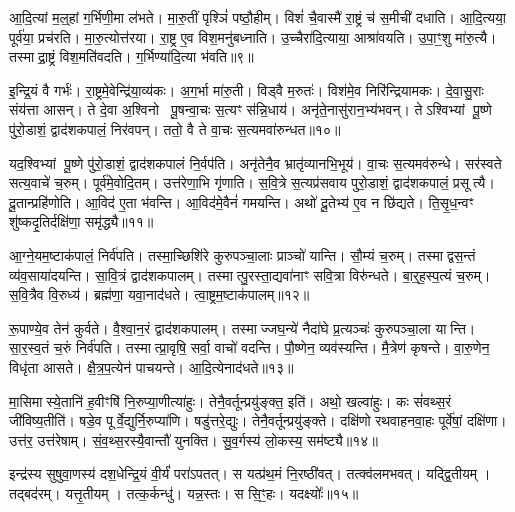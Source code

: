 आ॒दि॒त्यां म॒ल्॒हां ग॒र्भिणी॒मा ल॑भते।
मा॒रु॒तीं पृश्ञिं॑ पष्ठौ॒हीम्।
विशं॑ चै॒वास्मै॑ रा॒ष्ट्रं च॑ स॒मीची॑ दधाति।
आ॒दि॒त्यया॒ पूर्व॑या॒ प्रच॑रति।
मा॒रु॒त्योत्त॑रया।
रा॒ष्ट्र ए॒व विश॒मनु॑बध्नाति।
उ॒च्चैरा॑दि॒त्याया॒ आश्रा॑वयति।
उ॒पा॒ꣳ॒शु मा॑रु॒त्यै।
तस्माद्रा॒ष्ट्रं विश॒मति॑वदति।
ग॒र्भिण्या॑दि॒त्या भ॑वति॥९॥

इ॒न्द्रि॒यं वै गर्भः॑।
रा॒ष्ट्रमे॒वेन्द्रि॑या॒व्य॑कः।
अ॒ग॒र्भा मा॑रु॒ती।
विड्वै म॒रुतः॑।
विश॑मे॒व निरि॑न्द्रियामकः।
दे॒वा॒सु॒राः संय॑त्ता आसन्।
ते दे॒वा अ॒श्विनो पू॒षन्वा॒चः स॒त्यꣳ स॑न्नि॒धाय॑।
अनृ॑ते॒नासु॑रान॒भ्य॑भवन्।
तेऽश्विभ्यां पू॒ष्णे पु॑रो॒डाशं॒ द्वाद॑शकपालं॒ निर॑वपन्।
ततो॒ वै ते वा॒चः स॒त्यमवा॑रुन्धत॥१०॥

यद॒श्विभ्यां पू॒ष्णे पु॑रो॒डाशं॒ द्वाद॑शकपालं नि॒र्वप॑ति।
अनृ॑तेनै॒व भ्रातृ॑व्यानभि॒भूय॑।
वा॒चः स॒त्यमव॑रुन्धे।
सर॑स्वते सत्य॒वाचे॑ च॒रुम्।
पूर्व॑मे॒वोदि॒तम्।
उत्त॑रेणा॒भि गृ॑णाति।
स॒वि॒त्रे स॒त्यप्र॑सवाय पुरो॒डाशं॒ द्वाद॑शकपालं॒ प्रसूत्यै।
दू॒तान्प्रहि॑णोति।
आ॒विद॑ ए॒ता भ॑वन्ति।
आ॒विद॑मे॒वैनं॑ गमयन्ति।
अथो॑ दू॒तेभ्य॑ ए॒व न छि॑द्यते।
ति॒सृ॒ध॒न्वꣳ शु॑ष्कदृ॒तिर्दक्षि॑णा॒ समृ॑द्ध्यै॥११॥\anuvakamend[अ॒र्ध॒य॒ति॒ भ॒व॒त्य॒रु॒न्ध॒त॒ ग॒म॒य॒न्ति॒ द्वे च॑]

आ॒ग्ने॒यम॒ष्टाक॑पालं॒ निर्व॑पति।
तस्मा॒च्छिशि॑रे कुरुपञ्चा॒लाः प्राञ्चो॑ यान्ति।
सौ॒म्यं च॒रुम्।
तस्माद्वस॒न्तं व्य॑व॒साया॑दयन्ति।
सा॒वि॒त्रं द्वाद॑शकपालम्।
तस्मात्पु॒रस्ता॒द्यवा॑नाꣳ सवि॒त्रा विरु॑न्धते।
बा॒र्॒ह॒स्प॒त्यं च॒रुम्।
स॒वि॒त्रैव वि॒रुध्य॑।
ब्रह्म॑णा॒ यवा॒नाद॑धते।
त्वा॒ष्ट्रम॒ष्टाक॑पालम्॥१२॥

रू॒पाण्ये॒व तेन॑ कुर्वते।
वै॒श्वा॒न॒रं द्वाद॑शकपालम्।
तस्माज्जघ॒न्ये॑ नैदा॑घे प्र॒त्यञ्चः॑ कुरुपञ्चा॒ला यान्ति।
सा॒र॒स्व॒तं च॒रुं निर्व॑पति।
तस्मात्प्रा॒वृषि॒ सर्वा॒ वाचो॑ वदन्ति।
पौ॒ष्णेन॒ व्यव॑स्यन्ति।
मै॒त्रेण॑ कृषन्ते।
वा॒रु॒णेन॒ विधृ॑ता आसते।
क्षै॒त्र॒प॒त्येन॑ पाचयन्ते।
आ॒दि॒त्येनाद॑धते॥१३॥

मा॒सिमास्ये॒तानि॑ ह॒वीꣳषि॑ नि॒रुप्या॒णीत्या॑हुः।
तेनै॒वर्तून्प्रयु॑ङ्क्त॒ इति॑।
अथो॒ खल्वा॑हुः।
कः सं॑वथ्स॒रं जी॑विष्य॒तीति॑।
षडे॒व पूर्वे॒द्युर्नि॒रुप्या॑णि।
षडु॑त्तरे॒द्युः।
तेनै॒वर्तून्प्रयु॑ङ्क्ते।
दक्षि॑णो रथवाहनवा॒हः पूर्वे॑षां॒ दक्षि॑णा।
उत्त॑र॒ उत्त॑रेषाम्।
सं॒व॒थ्स॒रस्यै॒वान्तौ॑ युनक्ति।
सु॒व॒र्गस्य॑ लो॒कस्य॒ सम॑ष्ट्यै॥१४॥\anuvakamend[त्वा॒ष्ट्रम॒ष्टाक॑पालं दधते युन॒क्त्येकं॑ च]

इन्द्र॑स्य सुषुवा॒णस्य॑ दश॒धेन्द्रि॒यं वी॒र्यं॑ परा॑\-ऽपतत्।
स यत्प्र॑थ॒मं नि॒रष्ठी॑वत्।
तत्क्व॑लमभवत्।
यद्द्वि॒तीयम्।
तद्बद॑रम्।
यत्तृ॒तीयम्।
तत्क॒र्कन्धु॑।
यन्न॒स्तः।
स सि॒ꣳ॒हः।
यदक्ष्योः᳚॥१५॥

